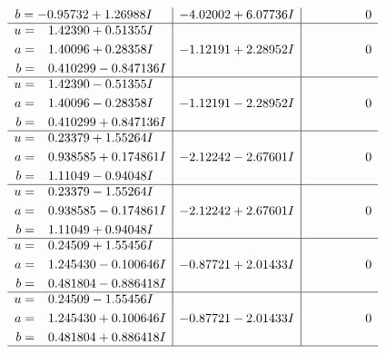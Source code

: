 \documentclass[1p]{elsarticle_modified}
\theoremstyle{definition}
\begin{document}
$$\begin{array}{c|c|c}
\begin{aligned}
b &= -0.95732 + 1.26988 I\end{aligned}
 & -4.02002 + 6.07736 I & \phantom{-0.000000 } 0 \\ \hline\begin{aligned}
u &= \phantom{-}1.42390 + 0.51355 I \\
a &= \phantom{-}1.40096 + 0.28358 I \\
b &= \phantom{-}0.410299 - 0.847136 I\end{aligned}
 & -1.12191 + 2.28952 I & \phantom{-0.000000 } 0 \\ \hline\begin{aligned}
u &= \phantom{-}1.42390 - 0.51355 I \\
a &= \phantom{-}1.40096 - 0.28358 I \\
b &= \phantom{-}0.410299 + 0.847136 I\end{aligned}
 & -1.12191 - 2.28952 I & \phantom{-0.000000 } 0 \\ \hline\begin{aligned}
u &= \phantom{-}0.23379 + 1.55264 I \\
a &= \phantom{-}0.938585 + 0.174861 I \\
b &= \phantom{-}1.11049 - 0.94048 I\end{aligned}
 & -2.12242 - 2.67601 I & \phantom{-0.000000 } 0 \\ \hline\begin{aligned}
u &= \phantom{-}0.23379 - 1.55264 I \\
a &= \phantom{-}0.938585 - 0.174861 I \\
b &= \phantom{-}1.11049 + 0.94048 I\end{aligned}
 & -2.12242 + 2.67601 I & \phantom{-0.000000 } 0 \\ \hline\begin{aligned}
u &= \phantom{-}0.24509 + 1.55456 I \\
a &= \phantom{-}1.245430 - 0.100646 I \\
b &= \phantom{-}0.481804 - 0.886418 I\end{aligned}
 & -0.87721 + 2.01433 I & \phantom{-0.000000 } 0 \\ \hline\begin{aligned}
u &= \phantom{-}0.24509 - 1.55456 I \\
a &= \phantom{-}1.245430 + 0.100646 I \\
b &= \phantom{-}0.481804 + 0.886418 I\end{aligned}
 & -0.87721 - 2.01433 I & \phantom{-0.000000 } 0\\
 \hline 

\end{array}$$
\end{document}
